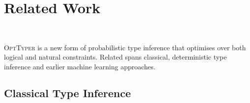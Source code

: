 \documentclass[acmsmall, review, anonymous]{acmart}\settopmatter{printfolios=true,printccs=false,printacmref=false}
\newcommand{\projectname}{\textsc{OptTyper}\xspace}
\newcommand{\margincomment}[2]{\marginpar{\scriptsize\color{Maroon}#1 says: #2}}
\newcommand{\adg}[1]{\margincomment{ADG}{#1}}
\newcommand{\etb}[1]{\margincomment{Earl}{#1}}
\begin{document}


\section{Related Work}~\label{sec:related}

\projectname is a new form of probabilistic type inference that optimises over
both logical and natural constraints.  Related spans classical, deterministic
type inference and earlier machine learning approaches.

\subsection{Classical Type Inference}

\end{document}

